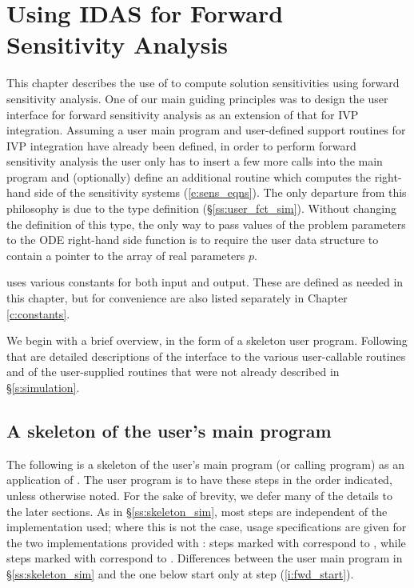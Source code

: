 \chapter{Using IDAS for Forward Sensitivity Analysis}\label{s:forward}

This chapter describes the use of {\idas} to compute solution sensitivities using
forward sensitivity analysis. One of our main guiding principles was to design 
the {\idas} user interface for forward sensitivity analysis as an extension of
that for IVP integration. Assuming a user main program and user-defined support 
routines for IVP integration have already been defined, in order to perform 
forward sensitivity analysis the user only has to insert a few more calls 
into the main program and (optionally) define an additional routine which
computes the right-hand side of the sensitivity systems (\ref{e:sens_eqns}). 
The only departure from this philosophy is due to the  type definition
(\S\ref{ss:user_fct_sim}). Without changing the definition of this type, the
only way to pass values of the problem parameters to the ODE right-hand side
function is to require the user data structure  to contain a pointer
to the array of real parameters $p$.

{\idas} uses various constants for both input and output.  These are
defined as needed in this chapter, but for convenience are also listed
separately in Chapter \ref{c:constants}.

We begin with a brief overview, in the form of a skeleton user program.
Following that are detailed descriptions of the interface to the
various user-callable routines and of the user-supplied routines that were not already
described in \S\ref{s:simulation}.

\section{A skeleton of the user's main program}\label{s:forward_usage}

The following is a skeleton of the user's main program (or calling
program) as an application of {\idas}. The user program is to have these 
steps in the order indicated, unless otherwise noted.
For the sake of brevity, we defer many of the details to the later sections.
As in \S\ref{ss:skeleton_sim}, most steps are independent of the {\nvector}
implementation used; where this is not the case, usage specifications are given for the
two implementations provided with {\idas}: steps marked with {\p} correspond to 
{\nvecp}, while steps marked with {\s} correspond to {\nvecs}.
Differences between the user main program in \S\ref{ss:skeleton_sim} and
the one below start only at step (\ref{i:fwd_start}).

